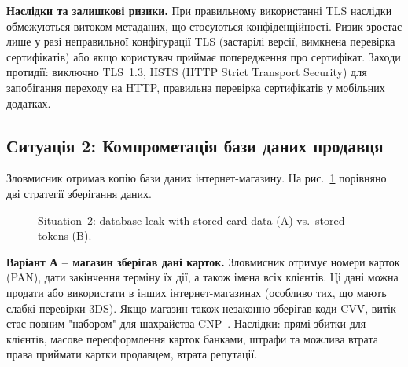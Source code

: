 \textbf{Наслідки та залишкові ризики.} При правильному використанні TLS наслідки обмежуються витоком метаданих, 
що стосуються конфіденційності. Ризик зростає лише у разі неправильної конфігурації TLS (застарілі версії, вимкнена 
перевірка сертифікатів) або якщо користувач приймає попередження про сертифікат. Заходи протидії: виключно 
TLS~1.3, HSTS (HTTP Strict Transport Security) для запобігання переходу на HTTP, правильна перевірка сертифікатів 
у мобільних додатках.

\subsection{Ситуація 2: Компрометація бази даних продавця}
\label{sec:s2}

Зловмисник отримав копію бази даних інтернет-магазину. На рис.~\ref{fig:s2} порівняно дві стратегії зберігання даних.

\begin{figure}[H]
    \centering
    \caption{Situation~2: database leak with stored card data (A) vs.\ stored tokens (B).}
    \label{fig:s2}
\end{figure}

\textbf{Варіант А -- магазин зберігав дані карток.} Зловмисник отримує номери карток (PAN), дати закінчення 
терміну їх дії, а також імена всіх клієнтів. Ці дані можна продати або використати в інших інтернет-магазинах 
(особливо тих, що мають слабкі перевірки 3DS). Якщо магазин також незаконно зберігав коди CVV, витік стає повним 
"набором"{} для шахрайства CNP~\cite{pci_faq_1280}. Наслідки: прямі збитки для клієнтів, масове переоформлення 
карток банками, штрафи та можлива втрата права приймати картки продавцем, втрата репутації.

